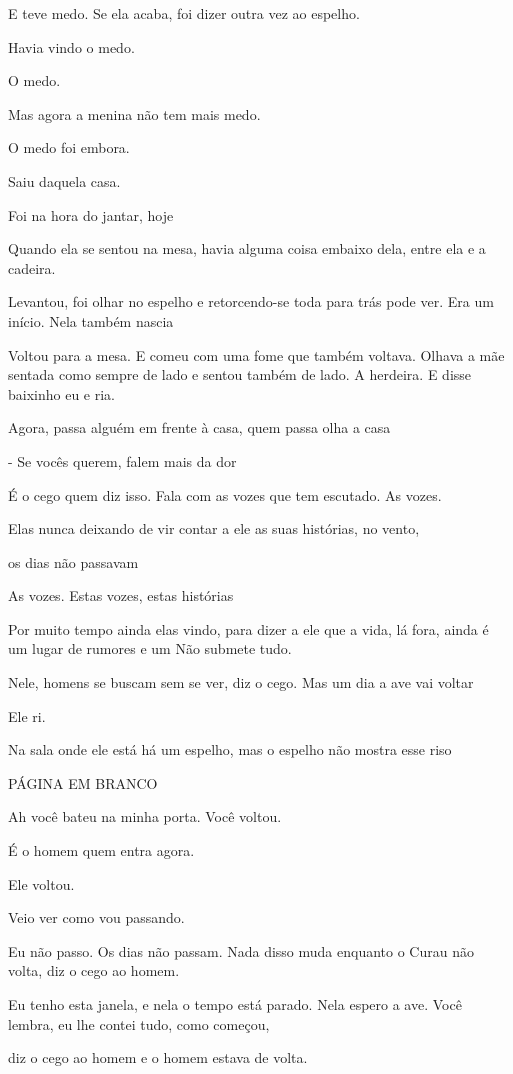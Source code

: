 E teve medo. Se ela acaba, foi dizer outra vez ao espelho.

Havia vindo o medo.

O medo.

Mas agora a menina não tem mais medo.

O medo foi embora.

Saiu daquela casa.

Foi na hora do jantar, hoje

Quando ela se sentou na mesa, havia alguma coisa embaixo dela, entre ela
e a cadeira.

Levantou, foi olhar no espelho e retorcendo-se toda para trás pode ver.
Era um início. Nela também nascia

Voltou para a mesa. E comeu com uma fome que também voltava. Olhava a
mãe sentada como sempre de lado e sentou também de lado. A herdeira. E
disse baixinho eu e ria.

Agora, passa alguém em frente à casa, quem passa olha a casa

- Se vocês querem, falem mais da dor

É o cego quem diz isso. Fala com as vozes que tem escutado. As vozes.

Elas nunca deixando de vir contar a ele as suas histórias, no vento,

os dias não passavam

As vozes. Estas vozes, estas histórias

Por muito tempo ainda elas vindo, para dizer a ele que a vida, lá fora,
ainda é um lugar de rumores e um Não submete tudo.

Nele, homens se buscam sem se ver, diz o cego. Mas um dia a ave vai
voltar

Ele ri.

Na sala onde ele está há um espelho, mas o espelho não mostra esse riso

PÁGINA EM BRANCO

Ah você bateu na minha porta. Você voltou.

É o homem quem entra agora.

Ele voltou.

Veio ver como vou passando.

Eu não passo. Os dias não passam. Nada disso muda enquanto o Curau não
volta, diz o cego ao homem.

Eu tenho esta janela, e nela o tempo está parado. Nela espero a ave.
Você lembra, eu lhe contei tudo, como começou,

diz o cego ao homem e o homem estava de volta.

